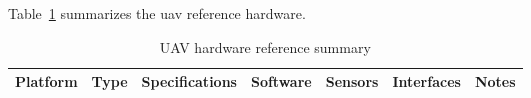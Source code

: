 Table~\ref{tab:hw-ref} summarizes the \gls{uav} reference hardware.
\begin{table}[!htbp]
  \centering
  \caption{UAV hardware reference summary}
  \label{tab:hw-ref}

  \begingroup
    \setlength{\tabcolsep}{3.5pt}   %
    \renewcommand{\arraystretch}{1.05}
    \scriptsize                    %

    \begin{tabularx}{\textwidth}{@{}
      >{\raggedright\arraybackslash}p{2.2cm}  %
      >{\raggedright\arraybackslash}p{1.2cm}  %
      >{\raggedright\arraybackslash}X  %
      >{\raggedright\arraybackslash}p{2.1cm}  %
      >{\raggedright\arraybackslash}p{2.4cm}  %
      >{\raggedright\arraybackslash}p{2.4cm}  %
      >{\raggedright\arraybackslash}p{1cm}         %
    @{}}
      \toprule
      \textbf{Platform} & \textbf{Type} & \textbf{Specifications} & \textbf{Software} &
      \textbf{Sensors} & \textbf{Interfaces} & \textbf{Notes} \\
      \midrule


\end{tabularx}
\end{table}
